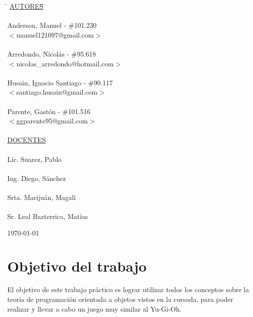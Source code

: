 \begin{titlepage}
	\begin{tabbing}
		\hspace{2cm}\=\+
		\underline{AUTORES}\hspace{-1cm}\=\+\hspace{1cm}\=\hspace{6cm}\=\\
		\\
		Anderson, Manuel			\>\>- \#101.230\\
		\>\footnotesize{$<$manuel121097@gmail.com$>$}\\
		\\
		Arredondo, Nicolás			\>\>- \#95.618\\
		\>\footnotesize{$<$nicolas\_arredondo@hotmail.com$>$}\\
		\\
		Husain, Ignacio Santiago	\>\>- \#90.117\\
		\>\footnotesize{$<$santiago.husain@gmail.com$>$}\\
		\\
		Parente, Gastón			 	\>\>- \#101.516 \\
		\>\footnotesize{$<$ggparente95@gmail.com$>$}\\
		\\
		\<\underline{DOCENTES}\\
		\\
		Lic. Suarez, Pablo \\
		\\
		Ing. Diego, Sánchez \\
		\\
		Srta. Marijuán, Magalí\\
		\\
		Sr. Leal Bazterrica, Matías
	\end{tabbing}


	\today

\end{titlepage}

\clearpage
\tableofcontents
\clearpage
\section{Objetivo del trabajo}

El objetivo de este trabajo práctico es lograr utilizar todos los conceptos sobre la teoría de programación orientada a objetos vistos en la cursada, para poder realizar y llevar a cabo un juego muy similar al Yu-Gi-Oh.

